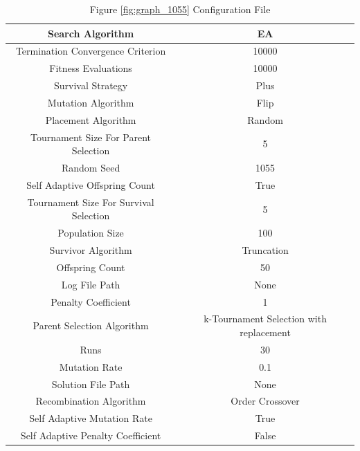\documentclass{standalone}
\begin{document}
\begin{table}[!htb]
	\centering
	\caption{Figure \ref{fig:graph_1055} Configuration File}
	\label{tab:graph_1055}
	\begin{tabular}{| c | c |}
		\hline
		Search Algorithm		& EA		 \\
		\hline
		Termination Convergence Criterion		& 10000		 \\
		\hline
		Fitness Evaluations		& 10000		 \\
		\hline
		Survival Strategy		& Plus		 \\
		\hline
		Mutation Algorithm		& Flip		 \\
		\hline
		Placement Algorithm		& Random		 \\
		\hline
		Tournament Size For Parent Selection		& 5		 \\
		\hline
		Random Seed		& 1055		 \\
		\hline
		Self Adaptive Offspring Count		& True		 \\
		\hline
		Tournament Size For Survival Selection		& 5		 \\
		\hline
		Population Size		& 100		 \\
		\hline
		Survivor Algorithm		& Truncation		 \\
		\hline
		Offspring Count		& 50		 \\
		\hline
		Log File Path		& None		 \\
		\hline
		Penalty Coefficient		& 1		 \\
		\hline
		Parent Selection Algorithm		& k-Tournament Selection with replacement		 \\
		\hline
		Runs		& 30		 \\
		\hline
		Mutation Rate		& 0.1		 \\
		\hline
		Solution File Path		& None		 \\
		\hline
		Recombination Algorithm		& Order Crossover		 \\
		\hline
		Self Adaptive Mutation Rate		& True		 \\
		\hline
		Self Adaptive Penalty Coefficient		& False		 \\
		\hline
	\end{tabular}
\end{table}
\end{document}
